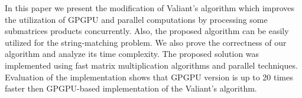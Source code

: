 In this paper we present the modification of Valiant's algorithm which improves the utilization of GPGPU and parallel computations by processing some submatrices products concurrently.
Also, the proposed algorithm can be easily utilized for the string-matching problem.
We also prove the correctness of our algorithm and analyze its time complexity.
The proposed solution was implemented using fast matrix multiplication algorithms and parallel techniques. Evaluation of the implementation shows that GPGPU version is up to 20 times faster then GPGPU-based implementation of the Valiant's algorithm.
